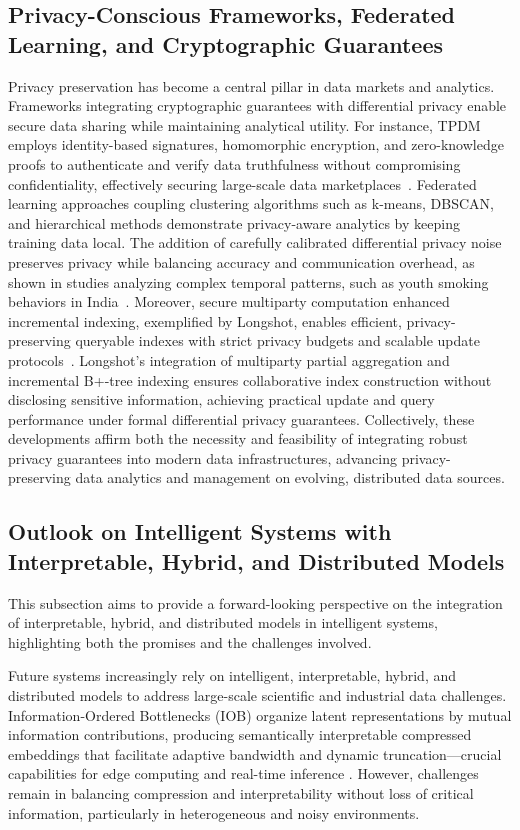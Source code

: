 \documentclass[sigconf]{acmart}
\begin{document}
\subsection{Privacy-Conscious Frameworks, Federated Learning, and Cryptographic Guarantees}

Privacy preservation has become a central pillar in data markets and analytics. Frameworks integrating cryptographic guarantees with differential privacy enable secure data sharing while maintaining analytical utility. For instance, TPDM employs identity-based signatures, homomorphic encryption, and zero-knowledge proofs to authenticate and verify data truthfulness without compromising confidentiality, effectively securing large-scale data marketplaces~\cite{ref28}. Federated learning approaches coupling clustering algorithms such as k-means, DBSCAN, and hierarchical methods demonstrate privacy-aware analytics by keeping training data local. The addition of carefully calibrated differential privacy noise preserves privacy while balancing accuracy and communication overhead, as shown in studies analyzing complex temporal patterns, such as youth smoking behaviors in India~\cite{ref23}. Moreover, secure multiparty computation enhanced incremental indexing, exemplified by Longshot, enables efficient, privacy-preserving queryable indexes with strict privacy budgets and scalable update protocols~\cite{ref28}. Longshot's integration of multiparty partial aggregation and incremental B+-tree indexing ensures collaborative index construction without disclosing sensitive information, achieving practical update and query performance under formal differential privacy guarantees. Collectively, these developments affirm both the necessity and feasibility of integrating robust privacy guarantees into modern data infrastructures, advancing privacy-preserving data analytics and management on evolving, distributed data sources.

\subsection{Outlook on Intelligent Systems with Interpretable, Hybrid, and Distributed Models}

This subsection aims to provide a forward-looking perspective on the integration of interpretable, hybrid, and distributed models in intelligent systems, highlighting both the promises and the challenges involved.

Future systems increasingly rely on intelligent, interpretable, hybrid, and distributed models to address large-scale scientific and industrial data challenges. Information-Ordered Bottlenecks (IOB) organize latent representations by mutual information contributions, producing semantically interpretable compressed embeddings that facilitate adaptive bandwidth and dynamic truncation—crucial capabilities for edge computing and real-time inference \cite{ref22}. However, challenges remain in balancing compression and interpretability without loss of critical information, particularly in heterogeneous and noisy environments.
\end{document}
